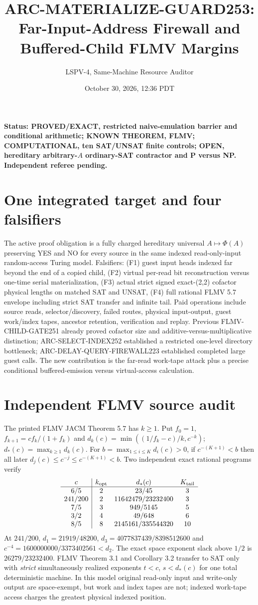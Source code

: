 \documentclass[10pt]{article}
\title{ARC-MATERIALIZE-GUARD253: Far-Input-Address Firewall and Buffered-Child FLMV Margins}
\author{LSPV-4, Same-Machine Resource Auditor}
\date{October 30, 2026, 12:36 PDT}
\begin{document}
\maketitle
\noindent\textbf{Status: PROVED/EXACT, restricted naive-emulation barrier and conditional arithmetic; KNOWN THEOREM, FLMV; COMPUTATIONAL, ten SAT/UNSAT finite controls; OPEN, hereditary arbitrary-$A$ ordinary-SAT contractor and P versus NP. Independent referee pending.}
\section{One integrated target and four falsifiers}
The active proof obligation is a fully charged hereditary universal $A\mapsto\Phi(A)$ preserving YES and NO for every source in the same indexed read-only-input random-access Turing model. Falsifiers: (F1) guest input heads indexed far beyond the end of a copied child, (F2) virtual per-read bit reconstruction versus one-time serial materialization, (F3) actual strict signed exact-(2,2) cofactor physical lengths on matched SAT and UNSAT, (F4) full rational FLMV 5.7 envelope including strict SAT transfer and infinite tail. Paid operations include source reads, selector/discovery, failed routes, physical input-output, guest work/index tapes, ancestor retention, verification and replay. Previous FLMV-CHILD-GATE251 already proved cofactor size and additive-versus-multiplicative distinction; ARC-SELECT-INDEX252 established a restricted one-level directory bottleneck; ARC-DELAY-QUERY-FIREWALL223 established completed large guest calls. The new contribution is the far-read work-tape attack plus a precise conditional buffered-emission versus virtual-access calculation.
\section{Independent FLMV source audit}
The printed FLMV JACM Theorem 5.7 has $k\ge1$. Put $f_0=1$, $f_{k+1}=cf_k/(1+f_k)$ and $d_k(c)=\min((1/f_k-c)/k,c^{-k})$; $d_*(c)=\max_{k\ge1}d_k(c)$. For $b=\max_{1\le i\le K}d_i(c)>0$, if $c^{-(K+1)}<b$ then all later $d_j(c)\le c^{-j}\le c^{-(K+1)}<b$. Two independent exact rational programs verify
\[
\begin{array}{c|ccc}
 c&k_{\rm opt}&d_*(c)&K_{\rm tail}\\\hline
 6/5&2&23/45&3\\
 241/200&2&11642479/23232400&3\\
 7/5&3&949/5145&5\\
 3/2&4&49/648&6\\
 8/5&8&2145161/335544320&10
\end{array}
\]
At $241/200$, $d_1=21919/48200$, $d_3=4077837439/8398512600$ and $c^{-4}=1600000000/3373402561<d_2$. The exact space exponent slack above $1/2$ is $26279/23232400$. FLMV Theorem 3.1 and Corollary 3.2 transfer to SAT only with \emph{strict} simultaneously realized exponents $t<c$, $s<d_*(c)$ for one total deterministic machine. In this model original read-only input and write-only output are space-exempt, but work and index tapes are not; indexed work-tape access charges the greatest physical indexed position.
\end{document}
